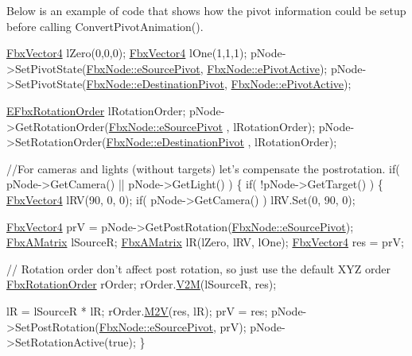 Below is an example of code that shows how the pivot information could be setup before calling Convert\+Pivot\+Animation(). 
\begin{DoxyCode}
\hyperlink{class_fbx_vector4}{FbxVector4} lZero(0,0,0);
\hyperlink{class_fbx_vector4}{FbxVector4} lOne(1,1,1);
pNode->SetPivotState(\hyperlink{class_fbx_node_ae62b7311ac4727654cdf1ebd5cbf7343ae8ed37a5c7e41f8d1cec9d3fa8424b69}{FbxNode::eSourcePivot}, 
      \hyperlink{class_fbx_node_a153fc75958227fc6728a2233b630b58aa3e58a6a13e3ace7a8df4e10d38e830ad}{FbxNode::ePivotActive});
pNode->SetPivotState(\hyperlink{class_fbx_node_ae62b7311ac4727654cdf1ebd5cbf7343a9822ce03ebfd64b85ca6a570201eb3cc}{FbxNode::eDestinationPivot}, 
      \hyperlink{class_fbx_node_a153fc75958227fc6728a2233b630b58aa3e58a6a13e3ace7a8df4e10d38e830ad}{FbxNode::ePivotActive});

\hyperlink{fbxmath_8h_ae46778666b56bb0abe5992b855fe9332}{EFbxRotationOrder} lRotationOrder;
pNode->GetRotationOrder(\hyperlink{class_fbx_node_ae62b7311ac4727654cdf1ebd5cbf7343ae8ed37a5c7e41f8d1cec9d3fa8424b69}{FbxNode::eSourcePivot} , lRotationOrder);
pNode->SetRotationOrder(\hyperlink{class_fbx_node_ae62b7311ac4727654cdf1ebd5cbf7343a9822ce03ebfd64b85ca6a570201eb3cc}{FbxNode::eDestinationPivot} , lRotationOrder);

\textcolor{comment}{//For cameras and lights (without targets) let's compensate the postrotation.}
\textcolor{keywordflow}{if}( pNode->GetCamera() || pNode->GetLight() )
\{
   \textcolor{keywordflow}{if}( !pNode->GetTarget() )
   \{
       \hyperlink{class_fbx_vector4}{FbxVector4} lRV(90, 0, 0);
       \textcolor{keywordflow}{if}( pNode->GetCamera() )
          lRV.Set(0, 90, 0);

       \hyperlink{class_fbx_vector4}{FbxVector4} prV = pNode->GetPostRotation(\hyperlink{class_fbx_node_ae62b7311ac4727654cdf1ebd5cbf7343ae8ed37a5c7e41f8d1cec9d3fa8424b69}{FbxNode::eSourcePivot});
       \hyperlink{class_fbx_a_matrix}{FbxAMatrix} lSourceR;
       \hyperlink{class_fbx_a_matrix}{FbxAMatrix} lR(lZero, lRV, lOne);
       \hyperlink{class_fbx_vector4}{FbxVector4} res = prV;

       \textcolor{comment}{// Rotation order don't affect post rotation, so just use the default XYZ order}
       \hyperlink{class_fbx_rotation_order}{FbxRotationOrder} rOrder;
       rOrder.\hyperlink{class_fbx_rotation_order_a51aaffe701607ad3ce75f153f8ff1965}{V2M}(lSourceR, res);

       lR = lSourceR * lR;
       rOrder.\hyperlink{class_fbx_rotation_order_af1f1258fdb975cc35fc38456d6f8ba7c}{M2V}(res, lR);
       prV = res;
       pNode->SetPostRotation(\hyperlink{class_fbx_node_ae62b7311ac4727654cdf1ebd5cbf7343ae8ed37a5c7e41f8d1cec9d3fa8424b69}{FbxNode::eSourcePivot}, prV);
       pNode->SetRotationActive(\textcolor{keyword}{true});
   \}


\end{DoxyCode}
